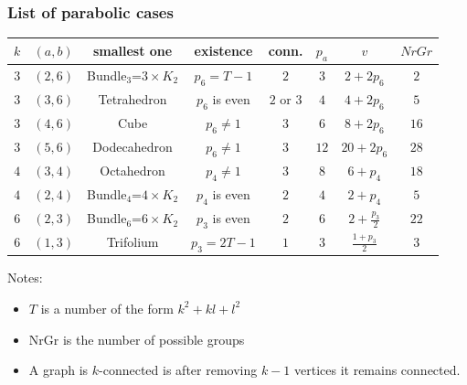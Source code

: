 \documentclass{beamer}
\begin{document}
\begin{frame}
  \frametitle{List of parabolic cases}

\begin{flushleft}
{\small
\hspace{-1cm}
\begin{minipage}{10cm}
\begin{tabular}{||c|c||c|c|c|c|c||c||}
\hline
\hline
$k$ & $(a,b)$ & smallest one & existence &conn.& $p_a$ & $v$&$NrGr$\\
\hline\hline
$3$ & $(2,6)$ &Bundle$_3$=$3\times K_2$  & $p_6 = T-1$&  $2$&$3$ &$2+2p_6$&$2$\\ \hline
$3$ & $(3,6)$ &Tetrahedron  & $p_6$ is even&$2$ or $3$& $4$ &$4+2p_6$&$5$\\ \hline
$3$ & $(4,6)$ & Cube & $p_{6} \neq 1$ &  $3$& $6$ &$8+2p_6$&$16$\\ \hline
$3$ & $(5,6)$ & Dodecahedron & $p_{6} \neq 1$&$3$ & $12$&$20+2p_6$&$28$\\  \hline\hline
$4$ & $(3,4)$ & Octahedron & $p_{4} \neq 1$ &  $3$&$8$ &$6+p_4$&$18$\\ \hline
$4$ & $(2,4)$ & Bundle$_4$=$4\times K_2$ & $p_4$ is even&  $2$&$4$ &$2+p_4$&$5$\\ \hline\hline
$6$ & $(2,3)$ & Bundle$_6$=$6\times K_2$ & $p_3$ is even&  $2$& $6$ &$2+\frac{p_3}{2}$&$22$\\ \hline
$6$ & $(1,3)$ &Trifolium  & $p_3 = 2T-1$&  $1$ &$3$ &$\frac{1+p_3}{2}$&$3$\\ \hline
\end{tabular}
\end{minipage}
}
\end{flushleft}
Notes:
\begin{itemize}
\item $T$ is a number of the form $k^2+kl+l^2$
\item NrGr is the number of possible groups
\item A graph is $k$-connected is after removing $k-1$ vertices it remains connected.
\end{itemize}

\end{frame}
\end{document}
